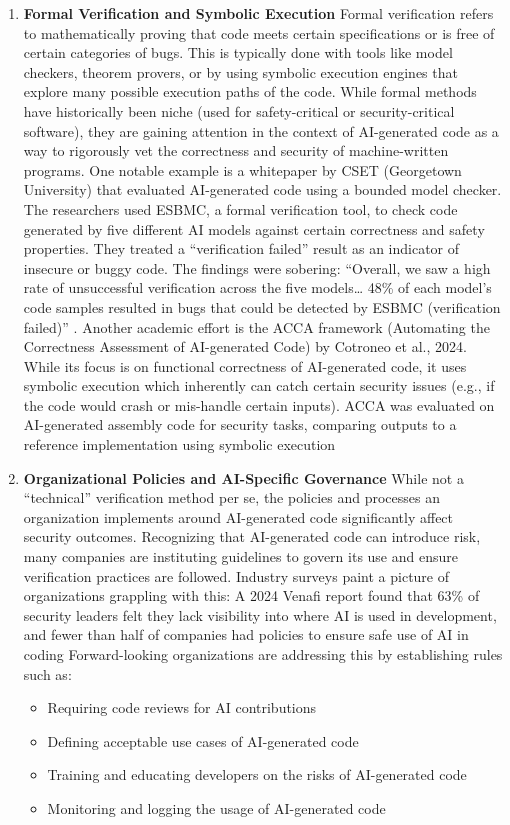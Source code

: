 \begin{enumerate}
    \item \textbf{Formal Verification and Symbolic Execution} Formal verification refers to mathematically proving that code meets certain specifications or is free of certain categories of bugs. This is typically done with tools like model checkers, theorem provers, or by using symbolic execution engines that explore many possible execution paths of the code. While formal methods have historically been niche (used for safety-critical or security-critical software), they are gaining attention in the context of AI-generated code as a way to rigorously vet the correctness and security of machine-written programs. One notable example is a whitepaper by CSET (Georgetown University) that evaluated AI-generated code using a bounded model checker. The researchers used ESBMC, a formal verification tool, to check code generated by five different AI models against certain correctness and safety properties.  They treated a “verification failed” result as an indicator of insecure or buggy code. The findings were sobering: “Overall, we saw a high rate of unsuccessful verification across the five models… 48\% of each model’s code samples resulted in bugs that could be detected by ESBMC (verification failed)” \cite{cybersecurity}. Another academic effort is the ACCA framework (Automating the Correctness Assessment of AI-generated Code) by Cotroneo et al., 2024. While its focus is on functional correctness of AI-generated code, it uses symbolic execution which inherently can catch certain security issues (e.g., if the code would crash or mis-handle certain inputs). ACCA was evaluated on AI-generated assembly code for security tasks, comparing outputs to a reference implementation using symbolic execution \cite{cotroneo2024acca}
    \item \textbf{Organizational Policies and AI-Specific Governance} While not a “technical” verification method per se, the policies and processes an organization implements around AI-generated code significantly affect security outcomes. Recognizing that AI-generated code can introduce risk, many companies are instituting guidelines to govern its use and ensure verification practices are followed. Industry surveys paint a picture of organizations grappling with this: A 2024 Venafi report found that 63\% of security leaders felt they lack visibility into where AI is used in development, and fewer than half of companies had policies to ensure safe use of AI in coding \cite{CyberLeaders}
    Forward-looking organizations are addressing this by establishing rules such as:
    \begin{itemize}
        \item Requiring code reviews for AI contributions
        \item Defining acceptable use cases of AI-generated code
        \item Training and educating developers on the risks of AI-generated code
        \item Monitoring and logging the usage of AI-generated code
    \end{itemize}
\end{enumerate}


